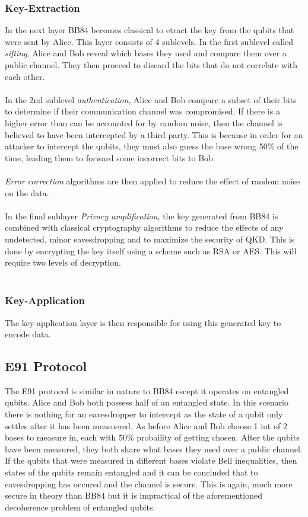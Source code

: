 \documentclass[journal]{IEEEtran}
\begin{document}
\subsubsection{Key-Extraction}
In the next layer BB84 becomes classical to etract the key from the qubits that were sent by Alice. This layer consists of 4 sublevels. In the first sublevel called \emph{sifting}, Alice and Bob reveal which bases they used and compare them over a public channel.
They then proceed to discard the bits that do not correlate with each other. \\ \\
In the 2nd sublevel \emph{authentication}, Alice and Bob compare a subset of their bits to determine if their communication channel was compromised. If there is a higher error than can be accounted for by random noise, then the channel is believed to have been intercepted by a third party. This is because in order for an attacker to intercept the qubits, 
they must also guess the base wrong 50\% of the time, leading them to forward some incorrect bits to Bob. \\ \\
\emph{Error correction} algorithms are then applied to reduce the effect of random noise on the data. \\ \\
In the final sublayer \emph{Privacy amplification}, the key generated from BB84 is combined with classical cryptography algorithms to reduce the effects of any undetected, minor eavesdropping and to maximize the security of QKD. This is done by encrypting the key itself using a scheme such as RSA or AES. This will require two levels of decryption. \\ \\
\subsubsection{Key-Application}
The key-application layer is then responsible for using this generated key to encode data.
\subsection{E91 Protocol}
The E91 protocol is similar in nature to BB84 escept it operates on entangled qubits. Alice and Bob both possess half of an entangled state. In this scenario there is nothing for an eavesdropper to intercept as the state of a qubit only settles after it has been measuered. As before Alice and Bob choose 1 iut of 2 bases to measure in, each with 50\% probaility of getting chosen.
After the qubits have been measured, they both share what bases they used over a public channel. If the qubits that were measured in different bases violate Bell inequalities, then states of the qubits remain entangled and it can be concluded that to eavesdropping has occured and the channel is secure. This is again, much more secure in theory than BB84 but it is impractical of the aforementioned
decoherence problem of entangled qubits.
\end{document}
